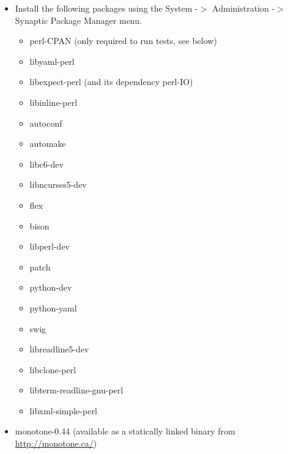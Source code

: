 \documentclass[12pt]{article}
\begin{document}
\begin{itemize}
   \item[] Install the following packages using the System -$>$ Administration -$>$ Synaptic Package Manager menu.
      \begin{itemize}
         \item perl-CPAN (only required to run tests, see below)
         \item libyaml-perl
         \item libexpect-perl (and its dependency perl-IO)
         \item libinline-perl
         \item autoconf
         \item automake
         \item libc6-dev
         \item libncurses5-dev
         \item flex
         \item bison
         \item libperl-dev
         \item patch
         \item python-dev
         \item python-yaml
         \item swig
         \item libreadline5-dev
         \item libclone-perl
         \item libterm-readline-gnu-perl
         \item libxml-simple-perl
      \end{itemize}
   \item[] monotone-0.44 (available as a statically linked binary from \href{http://monotone.ca/}{http://monotone.ca/})
 \end{itemize}
\end{document}
